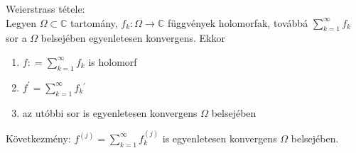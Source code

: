 \documentclass[12pt,a4paper]{scrartcl}
\providecommand{\tightlist}{%
  \setlength{\itemsep}{0pt}\setlength{\parskip}{0pt}}
\newenvironment{tetel}{}{}
\begin{document}
\begin{tetel}

Weierstrass tétele:\\
Legyen \(\Omega \subset {\mathbb{C}}\) tartomány,
\(\left. f_{k}:\Omega\rightarrow{\mathbb{C}} \right.\) függvények
holomorfak, továbbá \(\sum\limits_{k = 1}^{\infty}f_{k}\) sor a
\(\Omega\) belsejében egyenletesen konvergens. Ekkor

\begin{enumerate}
\def\labelenumi{\arabic{enumi}.}
\tightlist
\item
  \(f: = {\sum\limits_{k = 1}^{\infty}f_{k}}\) is holomorf
\item
  \(f^{\prime} = {\sum\limits_{k = 1}^{\infty}{f_{k}{}^{\prime}}}\)
\item
  az utóbbi sor is egyenletesen konvergens \(\Omega\) belsejében
\end{enumerate}

\end{tetel}

Következmény: \(f^{(j)} = {\sum\limits_{k = 1}^{\infty}f_{k}^{(j)}}\) is
egyenletesen konvergens \(\Omega\) belsejében.
\end{document}
